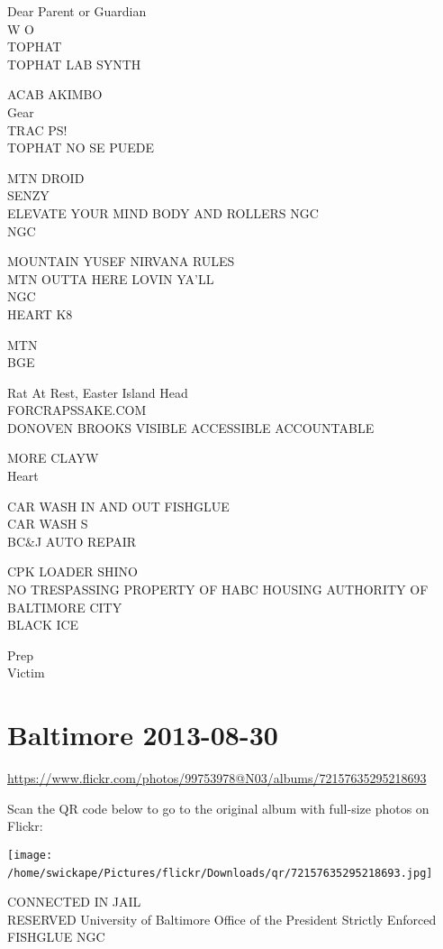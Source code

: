 \documentclass[10pt,letterpaper]{article}
\begin{document}
Dear Parent or Guardian\\
W O\\
TOPHAT\\
TOPHAT LAB SYNTH

ACAB AKIMBO\\
Gear\\
TRAC PS!\\
TOPHAT NO SE PUEDE

MTN DROID\\
SENZY\\
ELEVATE YOUR MIND BODY AND ROLLERS NGC\\
NGC

MOUNTAIN YUSEF NIRVANA RULES\\
MTN OUTTA HERE LOVIN YA'LL\\
NGC\\
HEART K8

MTN\\
BGE

Rat At Rest, Easter Island Head\\
FORCRAPSSAKE.COM\\
DONOVEN BROOKS VISIBLE ACCESSIBLE ACCOUNTABLE

MORE CLAYW\\
Heart

CAR WASH IN AND OUT FISHGLUE\\
CAR WASH S\\
BC\&J AUTO REPAIR

CPK LOADER SHINO\\
NO TRESPASSING PROPERTY OF HABC HOUSING AUTHORITY OF BALTIMORE CITY\\
BLACK ICE

Prep\\
Victim
\

\section*{Baltimore 2013-08-30}

\url{https://www.flickr.com/photos/99753978@N03/albums/72157635295218693}

Scan the QR code below to go to the original album with full-size photos on Flickr:

\texttt{[image: /home/swickape/Pictures/flickr/Downloads/qr/72157635295218693.jpg]}
\

CONNECTED IN JAIL\\
RESERVED University of Baltimore Office of the President Strictly Enforced FISHGLUE NGC
\end{document}
